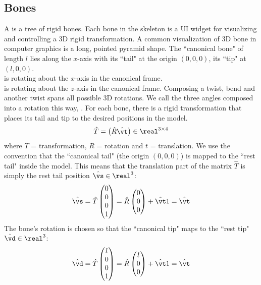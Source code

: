 \documentclass[11pt]{article}
\numberwithin{equation}{section}
\begin{document}
\subsection{Bones}
A  is a tree of rigid bones. Each bone in the skeleton is a UI widget for visualizing and controlling a 3D rigid transformation. A common visualization of 3D bone in computer graphics is a long, pointed pyramid shape.
The ``canonical bone" of length $l$ lies along the $x$-axis with its ``tail" at the origin $(0, 0, 0)$, its ``tip" at $(l, 0, 0)$.\\
 is rotating about the $x$-axis in the canonical frame.\\
 is rotating about the $z$-axis in the canonical frame.
\remark
Composing a twist, bend and another twist spans all possible 3D rotations.
We call the three angles composed into a rotation this way, .
For each bone, there is a rigid transformation that places its tail and tip to the desired positions in the model.
\begin{equation}
	\hat{T} = \begin{pmatrix}\hat{R}\hat{\vt}\end{pmatrix} \in \real^{3\times 4}
\end{equation}
where $T$ = transformation, $R$ = rotation and $t$ = translation.
We use the convention that the ``canonical tail" (the origin $(0,0,0)$) is mapped to the ``rest tail" inside the model. This means that the translation part of the matrix $\hat{T}$ is simply the rest tail position $\hat{\vs} \in \real^3$:
\begin{equation}
	\hat{\vs} = \hat{T}\begin{pmatrix}
		0 \\ 0\\ 0 \\ 1
	\end{pmatrix} = \hat{R} \begin{pmatrix}
		0 \\ 0 \\ 0 
	\end{pmatrix} + \hat{\vt}1 = \hat{\vt}
\end{equation}
The bone's rotation is chosen so that the ``canonical tip" maps to the ``rest tip" $\hat{\vd} \in \real^3$:
\begin{equation}
	\hat{\vd} = \hat{T}\begin{pmatrix}
		l \\ 0\\ 0 \\ 1
	\end{pmatrix} = \hat{R} \begin{pmatrix}
		l \\ 0 \\ 0 
	\end{pmatrix} + \hat{\vt}1 = \hat{\vt}
\end{equation}
\end{document}
